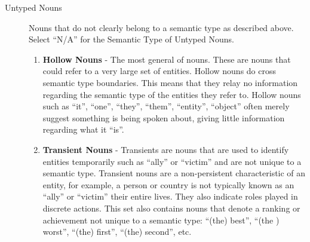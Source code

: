 \documentclass[letterpaper,12pt]{article}
\begin{document}
\begin{enumerate}

		\begin{description}
			\item[Untyped Nouns] Nouns that do not clearly belong to a semantic type as described above. Select ``N/A'' for the Semantic Type of Untyped Nouns.

			  \begin{enumerate}
				 \item \textbf{Hollow Nouns} - The most general of nouns. These are nouns that could refer to a very large set of entities.  Hollow nouns do cross semantic type boundaries. This means that they relay no information regarding the semantic type of the entities they refer to. Hollow nouns such as ``it'', ``one'', ``they'', ``them'', ``entity'', ``object'' often merely suggest something is being spoken about, giving little information regarding what it ``is''. 
				 \item \textbf{Transient Nouns} - Transients are nouns that are used to identify entities temporarily such as ``ally'' or ``victim'' and are not unique to a semantic type. Transient nouns are a non-persistent characteristic of an entity, for example, a person or country is not typically known as an ``ally'' or ``victim'' their entire lives. They also indicate roles played in discrete actions. This set also contains nouns that denote a ranking or achievement not unique to a semantic type: ``(the) best'', ``(the ) worst'', ``(the) first'', ``(the) second'', etc.
		 \end{enumerate}


\end{description}
\end{enumerate}
\end{document}
